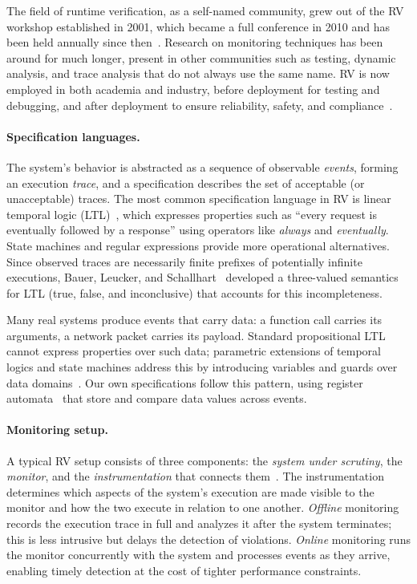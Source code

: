 The field of runtime verification, as a self-named community, grew out of the RV workshop established in 2001, which became a full conference in 2010 and has been held annually since then~\cite{BFFR18}. Research on monitoring techniques has been around for much longer, present in other communities such as testing, dynamic analysis, and trace analysis that do not always use the same name. RV is now employed in both academia and industry, before deployment for testing and debugging, and after deployment to ensure reliability, safety, and compliance~\cite{BFFR18, JLKWHSS16}.

\paragraph{Specification languages.}
The system's behavior is abstracted as a sequence of observable \emph{events}, forming an execution \emph{trace}, and a specification describes the set of acceptable (or unacceptable) traces. The most common specification language in RV is linear temporal logic (LTL)~\cite{Pnu77}, which expresses properties such as ``every request is eventually followed by a response'' using operators like \emph{always} and \emph{eventually}. State machines and regular expressions provide more operational alternatives. Since observed traces are necessarily finite prefixes of potentially infinite executions, Bauer, Leucker, and Schallhart~\cite{BLS11} developed a three-valued semantics for LTL (true, false, and inconclusive) that accounts for this incompleteness.

Many real systems produce events that carry data: a function call carries its arguments, a network packet carries its payload. Standard propositional LTL cannot express properties over such data; parametric extensions of temporal logics and state machines address this by introducing variables and guards over data domains~\cite{BFFR18}. Our own specifications follow this pattern, using register automata~\cite{GDPT13} that store and compare data values across events.

\paragraph{Monitoring setup.}
A typical RV setup consists of three components: the \emph{system under scrutiny}, the \emph{monitor}, and the \emph{instrumentation} that connects them~\cite{BFFR18}.
The instrumentation determines which aspects of the system's execution are made visible to the monitor and how the two execute in relation to one another.
\emph{Offline} monitoring records the execution trace in full and analyzes it after the system terminates; this is less intrusive but delays the detection of violations.
\emph{Online} monitoring runs the monitor concurrently with the system and processes events as they arrive, enabling timely detection at the cost of tighter performance constraints.

